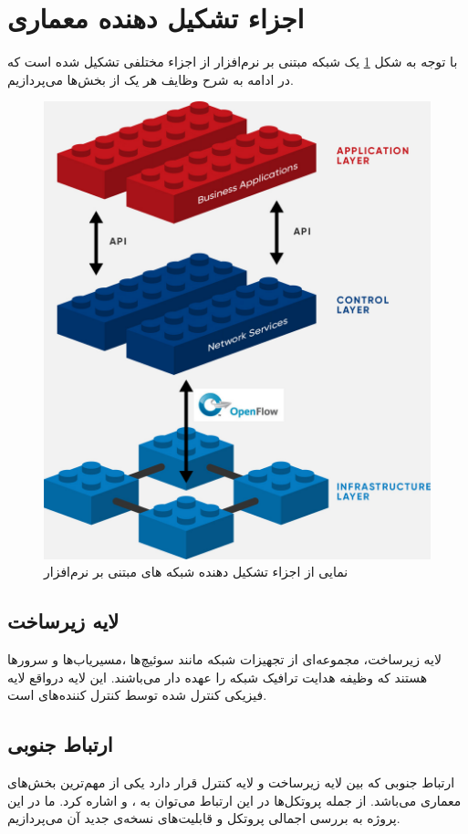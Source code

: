 \section{اجزاء تشکیل دهنده معماری }
با توجه به شکل \ref{fig2} یک شبکه مبتنی بر نرم‌افزار از اجزاء مختلفی تشکیل شده است که در ادامه به شرح وظایف هر یک از بخش‌ها می‌پردازیم.
\begin{figure}
	\centering
	\includegraphics[scale=0.2]{imgs/sdn-architecture-img.jpg}
	\caption{نمایی از اجزاء تشکیل دهنده شبکه های مبتنی بر نرم‌افزار \cite{onfsite}}
	\label{fig2}
\end{figure}

\subsection{لایه زیرساخت}
لایه زیرساخت، مجموعه‌ای از تجهیزات شبکه مانند سوئیچ‌ها ،مسیریاب‌ها و سرور‌ها هستند که وظیفه هدایت ترافیک شبکه را عهده دار می‌باشند. این لایه درواقع لایه فیزیکی کنترل شده توسط کنترل کننده‌های  است.

\subsection{ارتباط جنوبی}
ارتباط جنوبی که بین لایه زیرساخت و لایه کنترل قرار دارد یکی از مهم‌ترین بخش‌های معماری  می‌باشد. از جمله پروتکل‌‌ها در این ارتباط می‌توان به  ،  و  اشاره کرد. ما در این پروژه به بررسی اجمالی پروتکل  و قابلیت‌های نسخه‌ی جدید آن می‌پردازیم.

